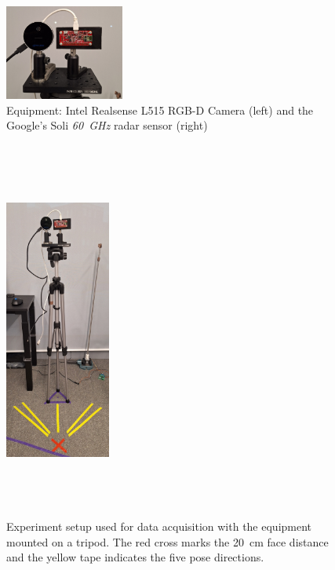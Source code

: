\documentclass{mpaper}
\begin{document}
\vspace{-0.25cm}
\begin{figure}[h!]
    \centering
    \includegraphics[width=0.35\textwidth,decodearray={1 1 1 1 1 1}]{figures/equipment.pdf}
    \vspace{0.1cm}
    \caption{Equipment: Intel Realsense L515 RGB-D Camera (left) and the Google's Soli \textit{\qty{60}{\GHz}} radar sensor (right)}
    \label{fig:equipment}
    \vspace{-0.3cm}
\end{figure}

\begin{figure}[h!]
    \centering
    \includegraphics[width=0.31\textwidth, height=12.5cm]{figures/experiment_setup.pdf}
    \vspace{0.2cm}
    \caption{Experiment setup used for data acquisition with the equipment mounted on a tripod. The red cross marks the \qty{20}{\cm} face distance and the yellow tape indicates the five pose directions.}
    \label{fig:experiment_setup}
    \vspace{-0.2cm}
\end{figure}
\end{document}
